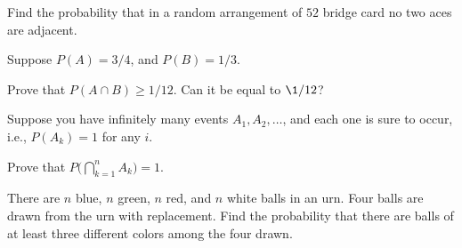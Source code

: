 \begin{problem}[Handout 2, \# 16]
  Find the probability that in a random arrangement of \(52\) bridge card
  no two aces are adjacent.
\end{problem}
\begin{solution*}
\end{solution*}

\begin{problem}[Handout 2, \# 17]
  Suppose \(P(A)=3/4\), and \(P(B)=1/3\).

  \noindent Prove that \(P(A\cap B)\geq 1/12\). Can it be equal to
  \(\1/12\)?
\end{problem}
\begin{solution*}
\end{solution*}

\begin{problem}[Handout 2, \# 18]
  Suppose you have infinitely many events \(A_1,A_2,\dotsc\), and each one
  is sure to occur, i.e., \(P(A_k)=1\) for any \(i\).

  \noindent Prove that \(P\bigl(\bigcap_{k=1}^n A_k\bigr)=1\).
\end{problem}
\begin{solution*}
\end{solution*}

\begin{problem}[Handout 2, \# 19]
  There are \(n\) blue, \(n\) green, \(n\) red, and \(n\) white balls in an
  urn. Four balls are drawn from the urn with replacement. Find the
  probability that there are balls of at least three different colors among
  the four drawn.
\end{problem}
\begin{solution*}
\end{solution*}

